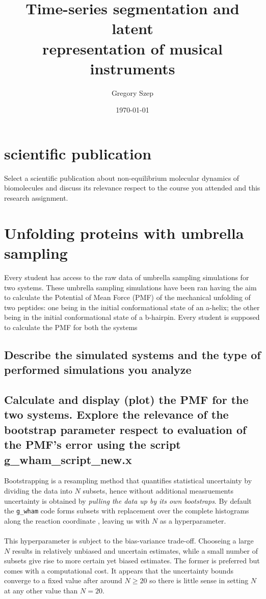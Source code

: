 \documentclass{article}[12pt]
\numberwithin{equation}{section}
\def\code#1{\texttt{#1}}
\begin{document}
\title{
Time-series segmentation and latent\\ representation of musical instruments
}

\author{Gregory Szep}
\date{\today}
\maketitle

\section{scientific publication}
Select a scientific publication about non-equilibrium molecular dynamics of
biomolecules and discuss its relevance respect to the course you attended and
this research assignment.

\section{Unfolding proteins with umbrella sampling}
Every student has access to the raw data of umbrella sampling simulations for
two systems. These umbrella sampling simulations have been ran having the
aim to calculate the Potential of Mean Force (PMF) of the mechanical unfolding
of two peptides: one being in the initial conformational state of an a-helix; the
other being in the initial conformational state of a b-hairpin. Every student is
supposed to calculate the PMF for both the systems
\subsection{Describe the simulated systems and the type of performed simulations you
analyze}
\subsection{Calculate and display (plot) the PMF for the two systems. Explore the
relevance of the bootstrap parameter respect to evaluation of the PMF’s error
using the script g_wham_script_new.x}

Bootstrapping is a resampling method that quantifies statistical uncertainty by
dividing the data into $N$ subsets, hence without additional measruements
uncertainty is obtained by \textit{pulling the data up by its own bootstraps}.
By default the \code{g\_wham} code forms subsets with replacement over the
complete histograms along the reaction coordinate \cite{gwham2010}, leaving us
with $N$ as a hyperparameter.
\\\\
This hyperparameter is subject to the bias-variance trade-off. Chooseing a large
$N$ results in relatively unbiased and uncertain estimates, while a small number
of subsets give rise to more certain yet biased estimates. The former is
preferred but comes with a computational cost. It appears that the uncertainty
bounds converge to a fixed value after around $N\geq20$ so there is little sense
in setting $N$ at any other value than $N=20$.
\end{document}
